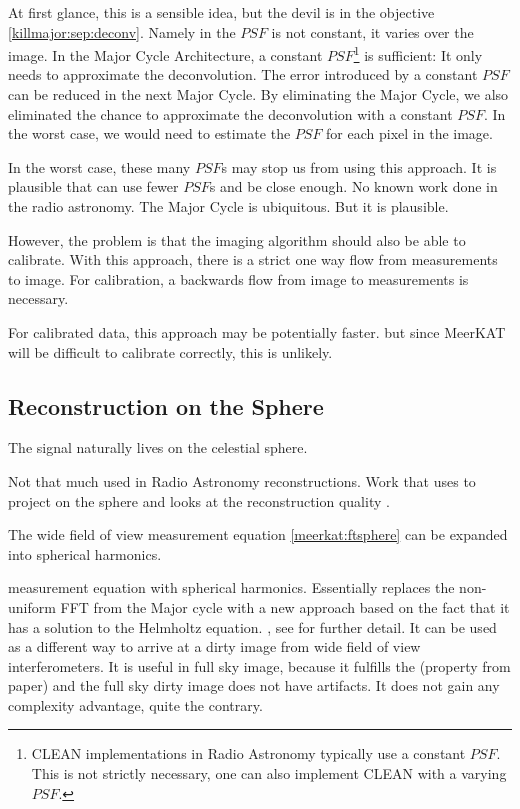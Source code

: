 At first glance, this is a sensible idea, but the devil is in the objective \eqref{killmajor:sep:deconv}. Namely in the $PSF$ is not constant, it varies over the image. In the Major Cycle Architecture, a constant $PSF$\footnote{CLEAN implementations in Radio Astronomy typically use a constant $PSF$. This is not strictly necessary, one can also implement CLEAN with a varying $PSF$.} is sufficient: It only needs to approximate the deconvolution. The error introduced by a constant $PSF$ can be reduced in the next Major Cycle. By eliminating the Major Cycle, we also eliminated the chance to approximate the deconvolution with a constant $PSF$. In the worst case, we would need to estimate the $PSF$ for each pixel in the image.

In the worst case, these many $PSF$s may stop us from using this approach. It is plausible that can use fewer $PSF$s and be close enough. No known work done in the radio astronomy. The Major Cycle is ubiquitous. But it is plausible.

However, the problem is that the imaging algorithm should also be able to calibrate. With this approach, there is a strict one way flow from measurements to image. For calibration, a backwards flow from image to measurements is necessary.

For calibrated data, this approach may be potentially faster. but since MeerKAT will be difficult to calibrate correctly, this is unlikely.


\subsection{Reconstruction on the Sphere}
The signal naturally lives on the celestial sphere.

Not that much used in Radio Astronomy reconstructions. Work that uses to project on the sphere and looks at the reconstruction quality \cite{mcewen2011compressed}.

The wide field of view measurement equation \eqref{meerkat:ftsphere} can be expanded into spherical harmonics.

\cite{carozzi2015imaging} measurement equation with spherical harmonics. Essentially replaces the non-uniform FFT from the Major cycle with a new approach based on the fact that it has a solution to the Helmholtz equation.
, see \cite{carozzi2015imaging} for further detail. It can be used as a different way to arrive at a dirty image from wide field of view interferometers. It is useful in full sky image, because it fulfills the (property from paper) and the full sky dirty image does not have artifacts. It does not gain any complexity advantage, quite the contrary.

